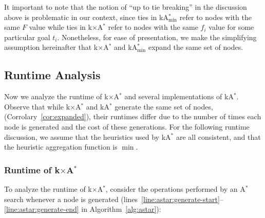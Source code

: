 \documentclass[smallextended]{svjour3}       %
\newcommand{\astar}{A$^*$\xspace}
\newcommand{\kastar}{kA$^*$\xspace}
\newcommand{\kastarvar}[1]{\textup{kA}$^*_{#1}$\xspace}
\newcommand{\kastarmin}{\kastarvar{\min}}
\newcommand{\kastarmax}{\kastarvar{\max}}
\newcommand{\kxastar}{k$\times$A$^*$\xspace}
\begin{document}

It important to note that the notion of ``up to tie breaking'' in the discussion above is problematic in our context, since ties in \kastarmin refer to nodes with the same $F$ value while ties in \kxastar refer to nodes with the same $f_i$ value for some particular goal $t_i$. Nonetheless, for ease of presentation, we make the simplifying assumption hereinafter that \kxastar and \kastarmin expand the same set of nodes.


\subsection{Runtime Analysis}

Now we analyze the runtime of \kxastar and several implementations of \kastar. Observe that while \kxastar and \kastar generate the same set of nodes, (Corrolary~\ref{cor:expanded}), their runtimes differ due to the number of times each node is generated and the cost of these generations. For the following runtime discussion, we assume that the heuristics used by \kastar are all consistent, and that the heuristic aggregation function is $\min$. 





\subsubsection{Runtime of \kxastar}
To analyze the runtime of \kxastar, consider the operations performed by an \astar search whenever a node is generated (lines~\ref{line:astar:generate-start}--\ref{line:astar:generate-end} in Algorithm~\ref{alg:astar}):
\end{document}
